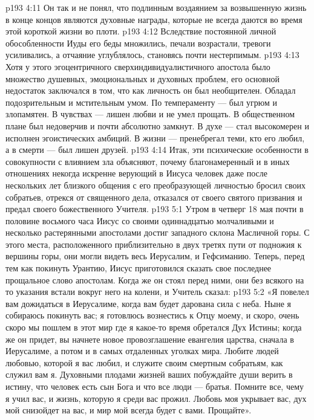 \vs p193 4:11 \bibnobreakspace Он так и не понял, что подлинным воздаянием за возвышенную жизнь в конце концов являются духовные награды, которые не всегда даются во время этой короткой жизни во плоти.
\vs p193 4:12 \pc Вследствие постоянной личной обособленности Иуды его беды множились, печали возрастали, тревоги усиливались, а отчаяние углублялось, становясь почти нестерпимым.
\vs p193 4:13 Хотя у этого эгоцентричного сверхиндивидуалистичного апостола было множество душевных, эмоциональных и духовных проблем, его основной недостаток заключался в том, что как личность он был необщителен. Обладал подозрительным и мстительным умом. По темпераменту --- был угрюм и злопамятен. В чувствах --- лишен любви и не умел прощать. В общественном плане был недоверчив и почти абсолютно замкнут. В духе --- стал высокомерен и исполнен эгоистических амбиций. В жизни --- пренебрегал теми, кто его любил, а в смерти --- был лишен друзей.
\vs p193 4:14 Итак, эти психические особенности в совокупности с влиянием зла объясняют, почему благонамеренный и в иных отношениях некогда искренне верующий в Иисуса человек даже после нескольких лет близкого общения с его преобразующей личностью бросил своих собратьев, отрекся от священного дела, отказался от своего святого призвания и предал своего божественного Учителя.
\vs p193 5:1 Утром в четверг 18 мая почти в половине восьмого часа Иисус со своими одиннадцатью молчаливыми и несколько растерянными апостолами достиг западного склона Масличной горы. С этого места, расположенного приблизительно в двух третях пути от подножия к вершины горы, они могли видеть весь Иерусалим, и Гефсиманию. Теперь, перед тем как покинуть Урантию, Иисус приготовился сказать свое последнее прощальное слово апостолам. Когда же он стоял перед ними, они без всякого на то указания встали вокруг него на колени, и Учитель сказал:
\vs p193 5:2 \pc «Я повелел вам дожидаться в Иерусалиме, когда вам будет дарована сила с неба. Ныне я собираюсь покинуть вас; я готовлюсь вознестись к Отцу моему, и скоро, очень скоро мы пошлем в этот мир где я какое\hyp{}то время обретался Дух Истины; когда же он придет, вы начнете новое провозглашение евангелия царства, сначала в Иерусалиме, а потом и в самых отдаленных уголках мира. Любите людей любовью, которой я вас любил, и служите своим смертным собратьям, как служил вам я. Духовными плодами жизней ваших побуждайте души верить в истину, что человек есть сын Бога и что все люди --- братья. Помните все, чему я учил вас, и жизнь, которую я среди вас прожил. Любовь моя укрывает вас, дух мой снизойдет на вас, и мир мой всегда будет с вами. Прощайте».
